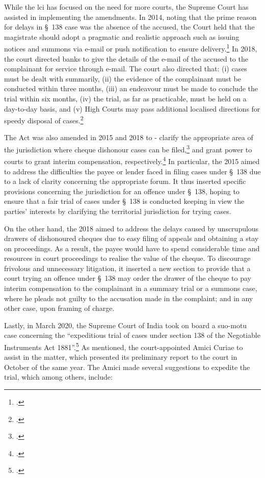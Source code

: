 \documentclass[12pt,a4paper]{article}
\begin{document}
While the \gls{lci} has focused on the need for more courts, the Supreme Court has assisted in implementing the amendments. In 2014, noting that the prime reason for delays in \S~138 case was the absence of the accused, the Court held that the magistrate should adopt a pragmatic and realistic approach such as issuing notices and summons via e-mail or push notification to ensure delivery.\footcite{sc2014_iba} In 2018, the court directed banks to give the details of the e-mail of the accused to the complainant for service through e-mail. The court also directed that: (i) cases must be dealt with summarily, (ii) the evidence of the complainant must be conducted within three months, (iii) an endeavour must be made to conclude the trial within six months, (iv) the trial, as far as practicable, must be held on a day-to-day basis, and (v) High Courts may pass additional localised directions for speedy disposal of cases.\footcite{sc2018_meters}

The Act was also amended in 2015 and 2018 to - clarify the appropriate area of the jurisdiction where cheque dishonour cases can be filed,\footcite{niAmend2015} and grant power to courts to grant interim compensation, respectively.\footcite{niAmend2018} In particular, the  2015 aimed to address the difficulties the payee or lender faced in filing cases under \S~138 due to a lack of clarity concerning the appropriate forum. It thus inserted specific provisions concerning the jurisdiction for an offence under \S~138, hoping to ensure that a fair trial of cases under \S~138 is conducted keeping in view the parties' interests by clarifying the territorial jurisdiction for trying cases.

On the other hand, the  2018 aimed to address the delays caused by unscrupulous drawers of dishonoured cheques due to easy filing of appeals and obtaining a stay on proceedings. As a result, the payee would have to spend considerable time and resources in court proceedings to realise the value of the cheque. To discourage frivolous and unnecessary litigation, it inserted a new section to provide that a court trying an offence under \S~138 may order the drawer of the cheque to pay interim compensation to the complainant in a summary trial or a summons case, where he pleads not guilty to the accusation made in the complaint; and in any other case, upon framing of charge.

Lastly, in March 2020, the Supreme Court of India took on board a suo-motu case concerning the “expeditious trial of cases under section 138 of the Negotiable Instruments Act 1881”.\footcite{sc2020_138} As mentioned, the court-appointed Amici Curiae to assist in the matter, which presented its preliminary report to the court in October of the same year. The Amici made several suggestions to expedite the trial, which among others, include:
\end{document}
